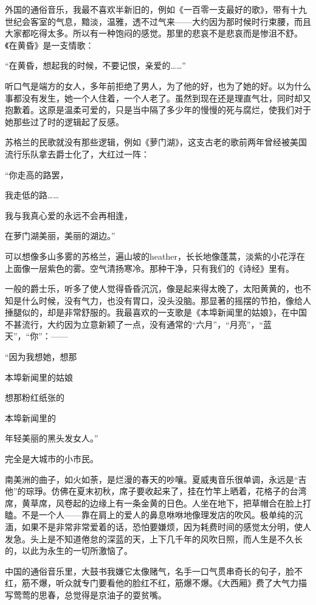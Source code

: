 \par 外国的通俗音乐，我最不喜欢半新旧的，例如《一百零一支最好的歌》，带有十九世纪会客室的气息，黯淡，温雅，透不过气来——大约因为那时候时行束腰，而且大家都吃得太多。所以有一种饱闷的感觉。那里的悲哀不是悲哀而是惨沮不舒。《在黄昏》是一支情歌：
\par “在黄昏，想起我的时候，不要记恨，亲爱的……”
\par 听口气是端方的女人，多年前拒绝了男人，为了他的好，也为了她的好。以为什么事都没有发生，她一个人住着，一个人老了。虽然到现在还是理直气壮，同时却又抱歉着。这原是温柔可爱的，只是当中隔了多少年的慢慢的死与腐烂，使我们对于她那些过了时的逻辑起了反感。
\par 苏格兰的民歌就没有那些逻辑，例如《萝门湖》，这支古老的歌前两年曾经被美国流行乐队拿去爵士化了，大红过一阵：
\par “你走高的路罢，
\par 我走低的路……
\par 我与我真心爱的永远不会再相逢，
\par 在萝门湖美丽，美丽的湖边。”
\par 可以想像多山多雾的苏格兰，遍山坡的heather，长长地像蓬蒿，淡紫的小花浮在上面像一层紫色的雾。空气清扬寒冷。那种干净，只有我们的《诗经》里有。
\par 一般的爵士乐，听多了使人觉得昏昏沉沉，像是起来得太晚了，太阳黄黄的，也不知是什么时候，没有气力，也没有胃口，没头没脑。那显著的摇摆的节拍，像给人捶腿似的，却是非常舒服的。我最喜欢的一支歌是《本埠新闻里的姑娘》，在中国不甚流行，大约因为立意新颖了一点，没有通常的“六月”，“月亮”，“蓝天”，“你”：——
\par “因为我想她，想那
\par 本埠新闻里的姑娘
\par 想那粉红纸张的
\par 本埠新闻里的
\par 年轻美丽的黑头发女人。”
\par 完全是大城市的小市民。
\par 南美洲的曲子，如火如荼，是烂漫的春天的吵嚷。夏威夷音乐很单调，永远是“吉他”的琮琤。仿佛在夏末初秋，席子要收起来了，挂在竹竿上晒着，花格子的台湾席，黄草席，风卷起的边缘上有一条金黄的日色。人坐在地下，把草帽合在脸上打瞌。不是一个人——靠在肩上的爱人的鼻息咻咻地像理发店的吹风。极单纯的沉湎，如果不是非常非常爱着的话，恐怕要嫌烦，因为耗费时间的感觉太分明，使人发急。头上是不知道倦怠的深蓝的天，上下几千年的风吹日照，而人生是不久长的，以此为永生的一切所激恼了。
\par 中国的通俗音乐里，大鼓书我嫌它太像赌气，名手一口气贯串奇长的句子，脸不红，筋不爆，听众就专门要看他的脸红不红，筋爆不爆。《大西厢》费了大气力描写莺莺的思春，总觉得是京油子的耍贫嘴。
